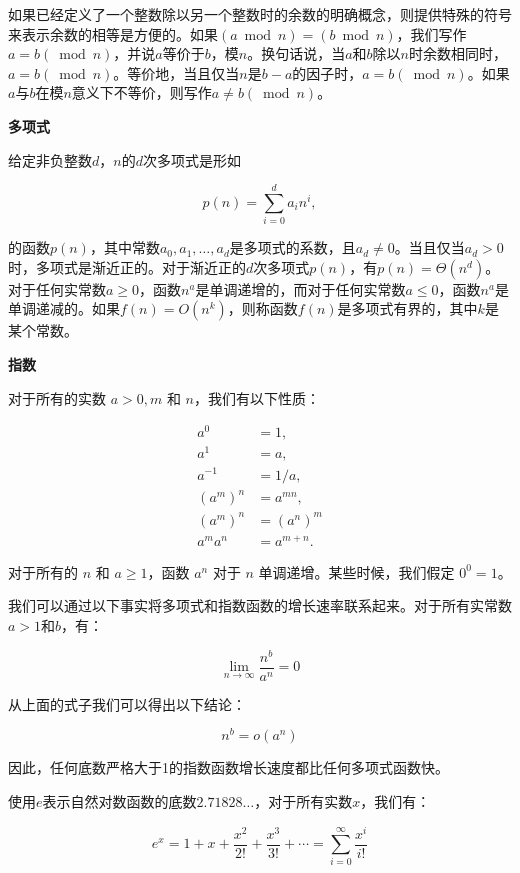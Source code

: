 \documentclass[lang=cn,newtx,10pt,scheme=chinese]{elegantbook}
\begin{document}
如果已经定义了一个整数除以另一个整数时的余数的明确概念，则提供特殊的符号来表示余数的相等是方便的。如果$(a \bmod n)=(b \bmod n)$，我们写作$a=b(\bmod n)$，并说$a$等价于$b$，模$n$。换句话说，当$a$和$b$除以$n$时余数相同时，$a=b(\bmod n)$。等价地，当且仅当$n$是$b-a$的因子时，$a=b(\bmod n)$。如果$a$与$b$在模$n$意义下不等价，则写作$a \neq b(\bmod n)$。

\textbf{多项式}

给定非负整数$d$，$n$的$d$次多项式是形如

$$
p(n)=\sum_{i=0}^d a_i n^i,
$$

的函数$p(n)$，其中常数$a_0, a_1, \ldots, a_d$是多项式的系数，且$a_d \neq 0$。当且仅当$a_d>0$时，多项式是渐近正的。对于渐近正的$d$次多项式$p(n)$，有$p(n)=\Theta\left(n^d\right)$。对于任何实常数$a \geq 0$，函数$n^a$是单调递增的，而对于任何实常数$a \leq 0$，函数$n^a$是单调递减的。如果$f(n)=O\left(n^k\right)$，则称函数$f(n)$是多项式有界的，其中$k$是某个常数。

\textbf{指数}

对于所有的实数 $a>0, m$ 和 $n$，我们有以下性质：

$$
\begin{aligned}
a^0 & =1, \\
a^1 & =a, \\
a^{-1} & =1 / a, \\
\left(a^m\right)^n & =a^{m n}, \\
\left(a^m\right)^n & =\left(a^n\right)^m \\
a^m a^n & =a^{m+n} .
\end{aligned}
$$

对于所有的 $n$ 和 $a \geq 1$，函数 $a^n$ 对于 $n$ 单调递增。某些时候，我们假定 $0^0=1$。

我们可以通过以下事实将多项式和指数函数的增长速率联系起来。对于所有实常数$a>1$和$b$，有：

$$
\lim _{n \rightarrow \infty} \frac{n^b}{a^n}=0
$$

从上面的式子我们可以得出以下结论：

\begin{equation}\label{eq:3.13}
n^b=o\left(a^n\right)
\end{equation}

因此，任何底数严格大于1的指数函数增长速度都比任何多项式函数快。

使用$e$表示自然对数函数的底数$2.71828 \ldots$，对于所有实数$x$，我们有：

$$
e^x=1+x+\frac{x^2}{2 !}+\frac{x^3}{3 !}+\cdots=\sum_{i=0}^{\infty} \frac{x^i}{i !}
$$
\end{document}
